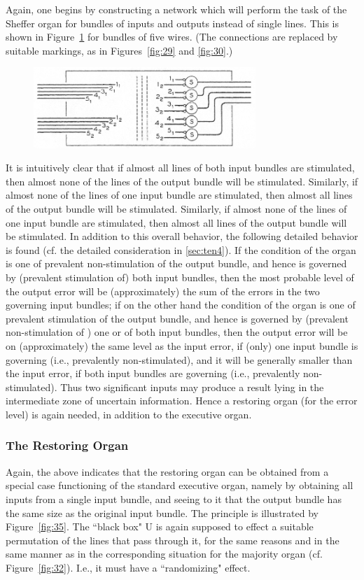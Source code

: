 \documentclass[twocolumn,preprintnumbers,amsmath,amssymb,floatfix]{revtex4}
\begin{document}
Again, one begins by constructing a network which will perform the
task of the Sheffer organ for bundles of inputs and outputs
instead of single lines. This is shown in Figure~\ref{fig:34} for
bundles of five wires. (The connections are replaced by suitable
markings, as in Figures~\ref{fig:29} and \ref{fig:30}.)

\begin{figure}
\includegraphics[width=3.3in]{fig_34}
\caption{\label{fig:34}}
\end{figure}

It is intuitively clear that if almost all lines of both input
bundles are stimulated, then almost none of the lines of the
output bundle will be stimulated. Similarly, if almost none of the
lines of one input bundle are stimulated, then almost all lines of
the output bundle will be stimulated. Similarly, if almost none of
the lines of one input bundle are stimulated, then almost all
lines of the output bundle will be stimulated. In addition to this
overall behavior, the following detailed behavior is found (cf.
the detailed consideration in \ref{sec:ten4}). If the condition of
the organ is one of prevalent non-stimulation of the output
bundle, and hence is governed by (prevalent stimulation of) both
input bundles, then the most probable level of the output error
will be (approximately) the sum of the errors in the two governing
input bundles; if on the other hand the condition of the organ is
one of prevalent stimulation of the output bundle, and hence is
governed by (prevalent non-stimulation of ) one or of both input
bundles, then the output error will be on (approximately) the same
level as the input error, if (only) one input bundle is governing
(i.e., prevalently non-stimulated), and it will be generally
smaller than the input error, if both input bundles are governing
(i.e., prevalently non-stimulated). Thus two significant inputs
may produce a result lying in the intermediate zone of uncertain
information. Hence a restoring organ (for the error level) is
again needed, in addition to the executive organ.

\subsubsection{\label{sec:nine4_2}The Restoring Organ} Again, the
above indicates that the restoring organ can be obtained from a
special case functioning of the standard executive organ, namely
by obtaining all inputs from a single input bundle, and seeing to
it that the output bundle has the same size as the original input
bundle. The principle is illustrated by Figure~\ref{fig:35}. The
``black box" \textsf{U} is again supposed to effect a suitable
permutation of the lines that pass through it, for the same
reasons and in the same manner as in the corresponding situation
for the majority organ (cf. Figure~\ref{fig:32}). I.e., it must
have a ``randomizing" effect.
\end{document}
